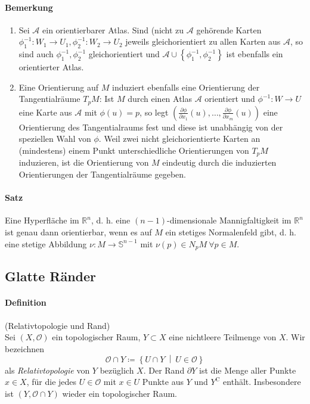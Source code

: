 \documentclass[12pt,a4paper,fleqn]{article}
\def\set#1{{\left\{ #1 \right\}}}
\def\Mid{\ \middle|\ }
\def\R{{\mathbb{R}}}
\begin{document}
\paragraph{Bemerkung}
\begin{enumerate}
\item Sei $\mathcal{A}$ ein orientierbarer Atlas. Sind (nicht zu $\mathcal{A}$ gehörende Karten $\phi^{-1}_1\colon W_1 \rightarrow U_1, \phi^{-1}_2\colon W_2 \rightarrow U_2$ jeweils gleichorientiert zu allen Karten aus $\mathcal{A}$, so sind auch $\phi_1^{-1}, \phi_2^{-1}$ gleichorientiert und $\mathcal{A} \cup \set{\phi_1^{-1}, \phi_2^{-1}}$ ist ebenfalls ein orientierter Atlas.
\item Eine Orientierung auf $M$ induziert ebenfalls eine Orientierung der Tangentialräume $T_p M$: Ist $M$ durch einen Atlas $\mathcal{A}$ orientiert und $\phi^{-1}\colon W \rightarrow U$ eine Karte aus $\mathcal{A}$ mit $\phi(u) = p$, so legt ${(\frac{\partial \phi}{\partial x_1}(u), \dots, \frac{\partial \phi}{\partial x_m}(u))}$ eine Orientierung des Tangentialraums fest und diese ist unabhängig von der speziellen Wahl von $\phi$. Weil zwei nicht gleichorientierte Karten an (mindestens) einem Punkt unterschiedliche Orientierungen von $T_p M$ induzieren, ist die Orientierung von $M$ eindeutig durch die induzierten Orientierungen der Tangentialräume gegeben.
\end{enumerate}

\paragraph{Satz} Eine Hyperfläche im $\R^n$, d. h. eine $(n - 1)$-dimensionale Mannigfaltigkeit im $\R^n$ ist genau dann orientierbar, wenn es auf $M$ ein stetiges Normalenfeld gibt, d. h. eine stetige Abbildung $\nu\colon M \rightarrow \mathbb{S}^{n-1}$ mit $\nu(p) \in N_p M\ \forall p \in M$.

\subsection{Glatte Ränder}

\paragraph{Definition} (Relativtopologie und Rand)\\
Sei $(X, \mathcal{O})$ ein topologischer Raum, $Y \subset X$ eine nichtleere Teilmenge von $X$. Wir bezeichnen
\begin{displaymath}
\mathcal{O} \cap Y \coloneqq \set{U\cap Y \Mid U \in \mathcal{O}}
\end{displaymath}
als \textit{Relativtopologie} von $Y$ bezüglich $X$.
Der Rand $\partial Y$ ist die Menge aller Punkte $x \in X$, für die jedes $U \in \mathcal{O}$ mit $x \in U$ Punkte aus $Y$ und $Y^\mathrm{C}$ enthält. Insbesondere ist $(Y, \mathcal{O} \cap Y)$ wieder ein topologischer Raum. 
\end{document}
